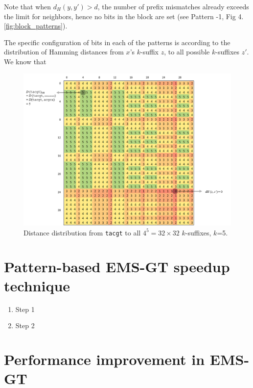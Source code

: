 \documentclass[oneside,12pt]{DISCSthesis}
\begin{document}
		\noindent Note that when $d_H(y,y') > d$, the number of prefix mismatches already exceeds the limit for neighbors, hence no bits in the block are set (see Pattern -1, Fig 4.\ref{fig:block_patterns}).

		\newpage
		\noindent The specific configuration of bits in each of the patterns is according to the distribution of Hamming distances from $x$'s $k$-suffix $z$, to all possible $k$-suffixes $z'$. We know that 

		\begin{figure}[h] \label{fig:D_tacgt}
			\includegraphics[width=6.0in]{img/D(tacgt)_marked_2}
			\caption{Distance distribution from \texttt{tacgt} to all $4^{5} = 32 \times 32$ $k$-suffixes, $k$=5.}
			\end{figure}


	\section{Pattern-based EMS-GT speedup technique}
		\begin{enumerate}
			\item Step 1
			\item Step 2
			\end{enumerate}

	\section{Performance improvement in EMS-GT}
\end{document}
